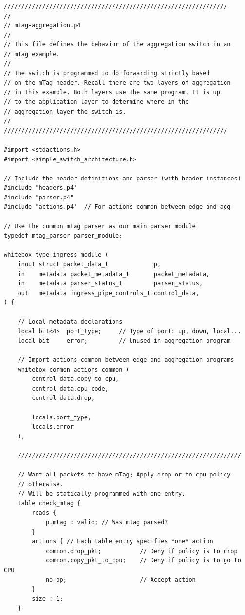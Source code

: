 \documentclass[12pt]{article}
\begin{document}
\begin{lstlisting}[style=P4style]
////////////////////////////////////////////////////////////////
//
// mtag-aggregation.p4
//
// This file defines the behavior of the aggregation switch in an
// mTag example.
//
// The switch is programmed to do forwarding strictly based
// on the mTag header. Recall there are two layers of aggregation
// in this example. Both layers use the same program. It is up
// to the application layer to determine where in the
// aggregation layer the switch is.
//
////////////////////////////////////////////////////////////////

#import <stdactions.h>
#import <simple_switch_architecture.h>

// Include the header definitions and parser (with header instances)
#include "headers.p4"
#include "parser.p4"
#include "actions.p4"  // For actions common between edge and agg

// Use the common mtag parser as our main parser module
typedef mtag_parser parser_module;

whitebox_type ingress_module (
    inout struct packet_data_t             p,
    in    metadata packet_metadata_t       packet_metadata,
    in    metadata parser_status_t         parser_status,
    out   metadata ingress_pipe_controls_t control_data,
) {
    
    // Local metadata declarations
    local bit<4>  port_type;     // Type of port: up, down, local...
    local bit     error;         // Unused in aggregation program

    // Import actions common between edge and aggregation programs
    whitebox common_actions common (
        control_data.copy_to_cpu,
        control_data.cpu_code,
        control_data.drop,

        locals.port_type,
        locals.error
    );

    ////////////////////////////////////////////////////////////////

    // Want all packets to have mTag; Apply drop or to-cpu policy
    // otherwise.
    // Will be statically programmed with one entry.
    table check_mtag {
        reads {
            p.mtag : valid; // Was mtag parsed?
        }
        actions { // Each table entry specifies *one* action
            common.drop_pkt;           // Deny if policy is to drop
            common.copy_pkt_to_cpu;    // Deny if policy is to go to CPU
            no_op;                     // Accept action
        }
        size : 1;
    }


\end{lstlisting}
\end{document}
